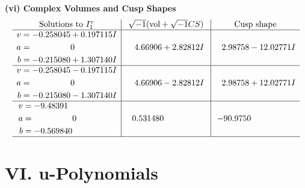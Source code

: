 \documentclass[1p]{elsarticle_modified}
\theoremstyle{definition}
\newcommand{\I}{\sqrt{-1}}
\begin{document}
\newpage\flushleft \textbf{(vi) Complex Volumes and Cusp Shapes}
$$\begin{array}{c|c|c}  
\text{Solutions to }I^v_{1}& \I (\text{vol} + \sqrt{-1}CS) & \text{Cusp shape}\\
 \hline 
\begin{aligned}
v &= -0.258045 + 0.197115 I \\
a &= \phantom{-0.000000 } 0 \\
b &= -0.215080 + 1.307140 I\end{aligned}
 & \phantom{-}4.66906 + 2.82812 I & \phantom{-}2.98758 - 12.02771 I \\ \hline\begin{aligned}
v &= -0.258045 - 0.197115 I \\
a &= \phantom{-0.000000 } 0 \\
b &= -0.215080 - 1.307140 I\end{aligned}
 & \phantom{-}4.66906 - 2.82812 I & \phantom{-}2.98758 + 12.02771 I \\ \hline\begin{aligned}
v &= -9.48391\phantom{ +0.000000I} \\
a &= \phantom{-0.000000 } 0 \\
b &= -0.569840\phantom{ +0.000000I}\end{aligned}
 & \phantom{-}0.531480\phantom{ +0.000000I} & -90.9750\phantom{ +0.000000I}\\
 \hline 
 \end{array}$$\newpage
\newpage\renewcommand{\arraystretch}{1}
\centering \section*{ VI. u-Polynomials}
\end{document}
